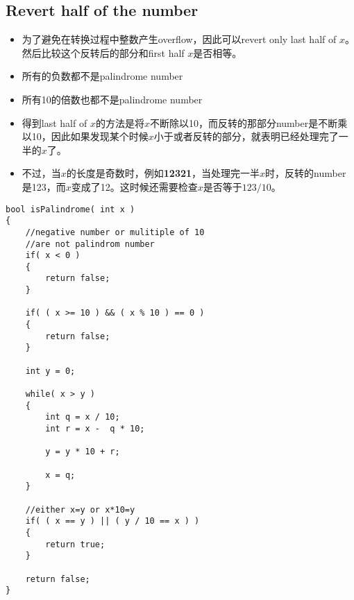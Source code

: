 \subsection{Revert half of the number}
\begin{itemize}
\item 为了避免在转换过程中整数产生overflow，因此可以revert only last half of $x$。然后比较这个反转后的部分和first half $x$是否相等。
\item 所有的负数都不是palindrome number
\item 所有10的倍数也都不是palindrome number
\item 得到last half of $x$的方法是将$x$不断除以10，而反转的那部分number是不断乘以10，因此如果发现某个时候$x$小于或者反转的部分，就表明已经处理完了一半的$x$了。
\item 不过，当$x$的长度是奇数时，例如\textbf{12321}，当处理完一半$x$时，反转的number是123，而$x$变成了12。这时候还需要检查$x$是否等于$123/10$。
\end{itemize}
\setcounter{lstlisting}{0}
\begin{lstlisting}[style=customc, caption={Revert half of the number}]
bool isPalindrome( int x )
{
    //negative number or mulitiple of 10
    //are not palindrom number
    if( x < 0 )
    {
        return false;
    }

    if( ( x >= 10 ) && ( x % 10 ) == 0 )
    {
        return false;
    }

    int y = 0;

    while( x > y )
    {
        int q = x / 10;
        int r = x -  q * 10;

        y = y * 10 + r;

        x = q;
    }

    //either x=y or x*10=y
    if( ( x == y ) || ( y / 10 == x ) )
    {
        return true;
    }

    return false;
}
\end{lstlisting}